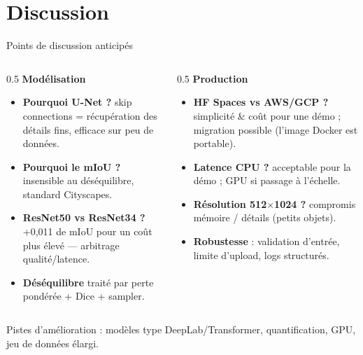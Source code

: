 \documentclass[aspectratio=169,11pt]{beamer}
\newcommand{\emphc}[1]{\textbf{\color{cvblue}#1}}
\begin{document}
\section{Discussion}
\begin{frame}{Points de discussion anticipés}
  \small
  \begin{columns}[T]
    \begin{column}{0.5\textwidth}
      \textbf{Modélisation}
      \begin{itemize}\footnotesize
        \item \emphc{Pourquoi U-Net ?} skip connections = récupération des détails fins,
          efficace sur peu de données.
        \item \emphc{Pourquoi le mIoU ?} insensible au déséquilibre, standard Cityscapes.
        \item \emphc{ResNet50 vs ResNet34 ?} +0{,}011 de mIoU pour un coût plus élevé —
          arbitrage qualité/latence.
        \item \emphc{Déséquilibre} traité par perte pondérée + Dice + sampler.
      \end{itemize}
    \end{column}
    \begin{column}{0.5\textwidth}
      \textbf{Production}
      \begin{itemize}\footnotesize
        \item \emphc{HF Spaces vs AWS/GCP ?} simplicité \& coût pour une démo ;
          migration possible (l'image Docker est portable).
        \item \emphc{Latence CPU ?} acceptable pour la démo ; GPU si passage à l'échelle.
        \item \emphc{Résolution 512$\times$1024 ?} compromis mémoire / détails
          (petits objets).
        \item \emphc{Robustesse} : validation d'entrée, limite d'upload, logs structurés.
      \end{itemize}
    \end{column}
  \end{columns}
  \vspace{0.4em}
  \begin{center}\footnotesize\color{cvblue}
    Pistes d'amélioration : modèles type DeepLab/Transformer, quantification, GPU, jeu de données élargi.
  \end{center}
\end{frame}
\end{document}

